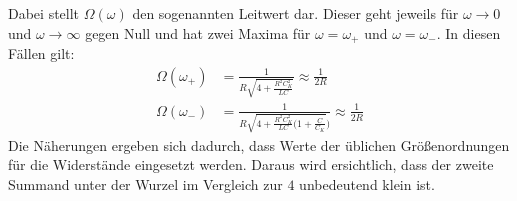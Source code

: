 Dabei stellt $\Omega (\omega)$ den sogenannten Leitwert dar. 
Dieser geht jeweils für ${\omega \to 0}$ und ${\omega \to \infty }$ gegen Null und hat zwei Maxima für ${\omega = \omega _+}$ und 
${\omega = \omega _-}$. 
In diesen Fällen gilt:
\begin{align}
    \Omega (\omega _+) &= \frac{1}{R\sqrt{4 + \frac{R^2C_K^2}{LC}}} \approx \frac{1}{2R} \\
    \Omega (\omega _-) &= \frac{1}{R\sqrt{4 + \frac{R^2C_K^2}{LC}(1 + \frac{C}{C_K}})} \approx \frac{1}{2R}  
\end{align}
Die Näherungen ergeben sich dadurch, dass Werte der üblichen Größenordnungen für die Widerstände eingesetzt werden.
Daraus wird ersichtlich, dass der zweite Summand unter der Wurzel im Vergleich zur $4$ unbedeutend klein ist. 


